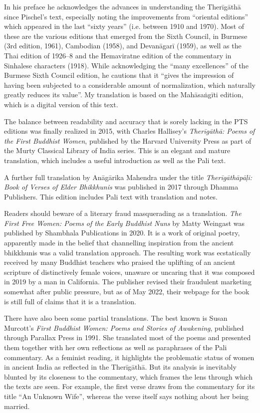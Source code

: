 \documentclass[12pt,openany]{book}%
\begin{document}
In his preface he acknowledges the advances in understanding the \textsanskrit{Therīgāthā} since Pischel’s text, especially noting the improvements from “oriental editions” which appeared in the last “sixty years” (i.e. between 1910 and 1970). Most of these are the various editions that emerged from the Sixth Council, in Burmese (3rd edition, 1961), Cambodian (1958), and \textsanskrit{Devanāgarī} (1959), as well as the Thai edition of 1926–8 and the Hemaviratne edition of the commentary in Sinhalese characters (1918). While acknowledging the “many excellences” of the Burmese Sixth Council edition, he cautions that it “gives the impression of having been subjected to a considerable amount of normalization, which naturally greatly reduces its value”. My translation is based on the  \textsanskrit{Mahāsaṅgīti} edition, which is a digital version of this text.

The balance between readability and accuracy that is sorely lacking in the PTS editions was finally realized in 2015, with Charles Hallisey’s \textit{\textsanskrit{Therīgāthā}: Poems of the First Buddhist Women}, published by the Harvard University Press as part of the Murty Classical Library of India series. This is an elegant and mature translation, which includes a useful introduction as well as the Pali text.

A further full translation by \textsanskrit{Anāgārika} Mahendra under the title \textit{\textsanskrit{Therīgāthāpāḷi}: Book of Verses of Elder Bhikkhunis} was published in 2017 through Dhamma Publishers. This edition includes Pali text with translation and notes.

Readers should beware of a literary fraud masquerading as a translation. \textit{The First Free Women: Poems of the Early Buddhist Nuns} by Matty Weingast was published by Shambhala Publications in 2020. It is a work of original poetry, apparently made in the belief that channelling inspiration from the ancient bhikkhunis was a valid translation approach. The resulting work was ecstatically received by many Buddhist teachers who praised the uplifting of an ancient scripture of distinctively female voices, unaware or uncaring that it was composed in 2019 by a man in California. The publisher revised their fraudulent marketing somewhat after public pressure, but as of May 2022, their webpage for the book is still full of claims that it is a translation.

There have also been some partial translations. The best known is Susan Murcott’s \textit{First Buddhist Women: Poems and Stories of Awakening}, published through Parallax Press in 1991. She translated most of the poems and presented them together with her own reflections as well as paraphrases of the Pali commentary. As a feminist reading, it highlights the problematic status of women in ancient India as reflected in the \textsanskrit{Therīgāthā}. But its analysis is inevitably blunted by its closeness to the commentary, which frames the lens through which the texts are seen. For example, the first verse draws from the commentary for its title “An Unknown Wife”, whereas the verse itself says nothing about her being married.
\end{document}
